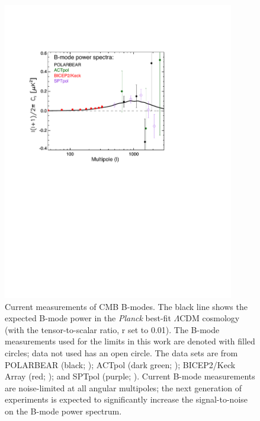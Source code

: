 \documentclass[preprint]{emulateapj}
\newcommand{\lcdm}{\ensuremath{\Lambda}CDM}
\newcommand{\planck}{{\sl Planck}}
\begin{document}
\begin{figure}[htb]\centering
\includegraphics[width=0.9\textwidth,clip,trim={1.5cm 12.5cm 5cm 3.8cm}]{pmf_experiments.pdf}
  \caption[Current measurements of CMB B-modes]{
  Current measurements of CMB B-modes. 
    The black line shows the expected B-mode power in the \planck{} best-fit \lcdm{} cosmology (with the tensor-to-scalar ratio, r set to 0.01). 
    The B-mode measurements used for the limits in this work are denoted with filled circles; data not used has an open circle. 
    The data sets are from POLARBEAR (black; \citet{polarbear14b}); ACTpol (dark green; \citet{naess14});  BICEP2/Keck Array (red; \citet{bicepkeck15}); and SPTpol (purple; \citet{keisler15}). 
      Current B-mode measurements are noise-limited at all angular multipoles; the next generation of experiments is expected to significantly increase the signal-to-noise on the B-mode power spectrum. 
           \label{fig:pmf-experiments}
  }
\end{figure}
\end{document}
